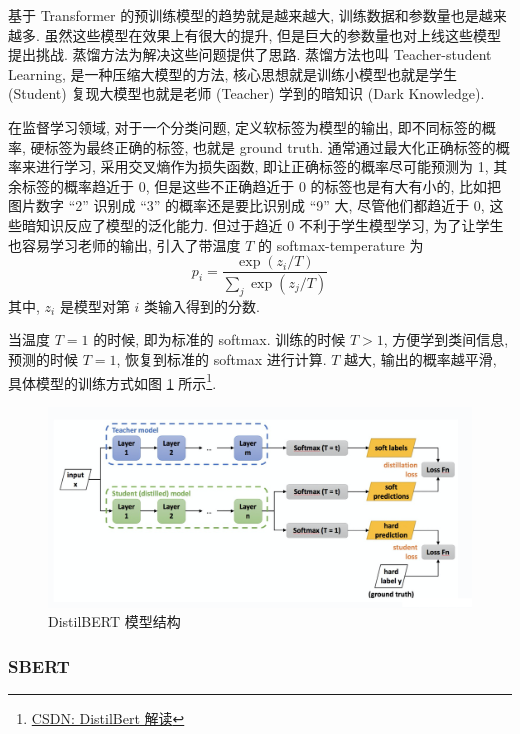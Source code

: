 \documentclass[12pt]{article}
\begin{document}
基于 Transformer 的预训练模型的趋势就是越来越大, 训练数据和参数量也是越来越多. 虽然这些模型在效果上有很大的提升, 但是巨大的参数量也对上线这些模型提出挑战. 蒸馏方法为解决这些问题提供了思路. 蒸馏方法也叫 Teacher-student Learning, 是一种压缩大模型的方法, 核心思想就是训练小模型也就是学生 (Student) 复现大模型也就是老师 (Teacher) 学到的暗知识 (Dark Knowledge). 

在监督学习领域, 对于一个分类问题, 定义软标签为模型的输出, 即不同标签的概率, 硬标签为最终正确的标签, 也就是 ground truth. 通常通过最大化正确标签的概率来进行学习, 采用交叉熵作为损失函数, 即让正确标签的概率尽可能预测为 1, 其余标签的概率趋近于 0, 但是这些不正确趋近于 0 的标签也是有大有小的, 比如把图片数字 ``2'' 识别成 ``3'' 的概率还是要比识别成 ``9'' 大, 尽管他们都趋近于 0, 这些暗知识反应了模型的泛化能力. 但过于趋近 0 不利于学生模型学习, 为了让学生也容易学习老师的输出, 引入了带温度 $T$ 的 softmax-temperature 为
\begin{equation}
  p_i=\frac{\exp(z_i/T)}{\sum_j\exp(z_j/T)}
\end{equation}
其中, $z_i$ 是模型对第 $i$ 类输入得到的分数.

当温度 $T=1$ 的时候, 即为标准的 softmax. 训练的时候 $T>1$, 方便学到类间信息, 预测的时候 $T=1$, 恢复到标准的 softmax 进行计算. $T$ 越大, 输出的概率越平滑, 具体模型的训练方式如图 \ref{fig:distilbert} 所示\footnote{\href{https://blog.csdn.net/fengzhou\_/article/details/107211090}{CSDN: DistilBert 解读}}.
\begin{figure}[htbp]
  \centering
  \includegraphics[width=16cm]{distilbert.png}
  \caption{DistilBERT 模型结构}
  \label{fig:distilbert}
\end{figure}

\subsubsection{SBERT}

\end{document}

